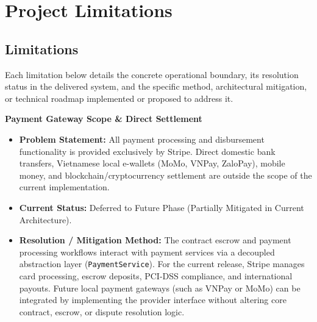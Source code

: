 \section{Project Limitations}

\subsection{Limitations}

Each limitation below details the concrete operational boundary, its resolution status in the delivered system, and the specific method, architectural mitigation, or technical roadmap implemented or proposed to address it.

\begin{description}[leftmargin=2.0cm,labelwidth=1.8cm,align=left,font=\normalfont\bfseries]

\item[LI-01] \textbf{Payment Gateway Scope \& Direct Settlement}
\begin{itemize}[leftmargin=0.5cm, label=--]
\item \textbf{Problem Statement:} All payment processing and disbursement functionality is provided exclusively by Stripe. Direct domestic bank transfers, Vietnamese local e-wallets (MoMo, VNPay, ZaloPay), mobile money, and blockchain/cryptocurrency settlement are outside the scope of the current implementation.
\item \textbf{Current Status:} Deferred to Future Phase (Partially Mitigated in Current Architecture).
\item \textbf{Resolution / Mitigation Method:} The contract escrow and payment processing workflows interact with payment services via a decoupled abstraction layer (\texttt{PaymentService}). For the current release, Stripe manages card processing, escrow deposits, PCI-DSS compliance, and international payouts. Future local payment gateways (such as VNPay or MoMo) can be integrated by implementing the provider interface without altering core contract, escrow, or dispute resolution logic.
\end{itemize}


\end{description}
